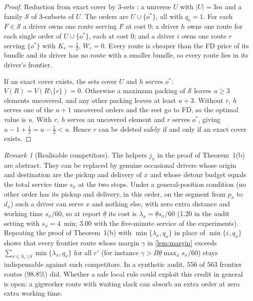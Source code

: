 \documentclass[11pt]{article}
\theoremstyle{definition}
\theoremstyle{remark}
\newtheorem{remark}{Remark}
\newcommand{\thl}{\underline{\theta}}
\begin{document}
\begin{proof}
Reduction from exact cover by 3-sets \citep{garey1979computers}: a universe $U$
with $|U|=3m$ and a family $\mathcal S$ of 3-subsets of $U$. The orders are
$U\cup\{o^\ast\}$, all with $q_o=1$. For each $F\in\mathcal S$ a driver owns one
route serving $F$ at cost $0$; a driver $h$ owns one route for each single order
of $U\cup\{o^\ast\}$, each at cost $0$; and a driver $i$ owns one route $r$ serving
$\{o^\ast\}$ with $K_r=\tfrac12$, $W_r=0$. Every route is cheaper than the FD
price of its bundle and its driver has no route with a smaller bundle, so every
route lies in its driver's frontier.

If an exact cover exists, the sets cover $U$ and $h$ serves $o^\ast$:
$V(R)=V(R\setminus\{r\})=0$. Otherwise a maximum packing of $\mathcal S$ leaves
$u\ge3$ elements uncovered, and any other packing leaves at least $u+3$. Without
$r$, $h$ serves one of the $u+1$ uncovered orders and the rest go to FD, so the
optimal value is $u$. With $r$, $h$ serves an uncovered element and $r$ serves
$o^\ast$, giving $u-1+\tfrac12=u-\tfrac12<u$. Hence $r$ can be deleted safely if
and only if an exact cover exists.
\end{proof}

\begin{remark}[Realisable competitors]\label{rem:realisable}
The helpers $j_x$ in the proof of Theorem~1(b) are abstract. They can be
replaced by genuine occasional drivers whose origin and destination are the
pickup and delivery of $x$ and whose detour budget equals the total service
time $s_x$ at the two stops. Under a general-position condition (no other order
has its pickup and delivery, in this order, on the segment from $p_x$ to $d_x$)
such a driver can serve $x$ and nothing else, with zero extra distance and
working time $s_x/60$, so at report $\thl$ its cost is
$\lambda_x=\thl s_x/60$ (1.20 in the audit setting with $s_x=4$~min; 3.00 with
the five-minute service of the experiments). Repeating the proof of
Theorem~1(b) with $\min\{\lambda_x,q_x\}$ in place of $\min\{\varepsilon,q_x\}$
shows that every frontier route whose margin $\gamma$ in \cref{lem:margin}
exceeds $\sum_{x\in S_{r'}\setminus S}\min\{\lambda_x,q_x\}$ for all $r'$ (for
instance $\gamma>B\thl\max_x s_x/60$) stays indispensable against such
competitors. In a synthetic audit, 556 of 563 frontier routes (98.8\%) did.
Whether a safe local rule could exploit this credit in general is open: a
gigworker route with waiting slack can absorb an extra order at zero extra
working time.
\end{remark}
\end{document}
